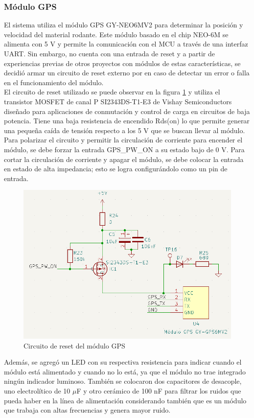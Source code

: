 \subsubsection{Módulo GPS}


El sistema utiliza el módulo GPS GY-NEO6MV2 para determinar la posición y velocidad del material rodante. Este módulo basado en el chip NEO-6M se alimenta con 5 V y permite la comunicación con el MCU a través de una interfaz UART. Sin embargo, no cuenta con una entrada de reset y a partir de experiencias previas de otros proyectos con módulos de estas características, se decidió armar un circuito de reset externo por en caso de detectar un error o falla en el funcionamiento del módulo. \\ 

El circuito de reset utilizado se puede observar en la figura \ref{fig:gps_sch} y utiliza el transistor MOSFET de canal P SI2343DS-T1-E3 de Vishay Semiconductors \cite{SI2343DS-T1-E3} diseñado para aplicaciones de conmutación y  control de carga en circuitos de baja potencia. Tiene una baja resistencia de encendido Rds(on) lo que permite generar una pequeña caída de tensión respecto a los 5 V que se buscan llevar al módulo. Para polarizar el circuito y permitir la circulación de corriente para encender el módulo, se debe forzar la entrada GPS\_PW\_ON a su estado bajo de 0 V. Para cortar la circulación de corriente y apagar el módulo, se debe colocar la entrada en estado de alta impedancia; esto se logra configurándolo como un pin de entrada.\\ 

\begin{figure}[H]
    \centering
    \includegraphics[width = 0.8 \linewidth]{img/gps_sch.png}
    \caption{Circuito de reset del módulo GPS}
    \label{fig:gps_sch}
\end{figure}    

Además, se agregó un LED con su respectiva resistencia para indicar cuando el módulo está alimentado y cuando no lo está, ya que el módulo no trae integrado ningún indicador luminoso. También se colocaron dos capacitores de desacople, uno electrolítico de 10 $\mu$F y otro cerámico de 100 nF para filtrar los ruidos que pueda haber en la línea de alimentación considerando también que es un módulo que trabaja con altas frecuencias y genera mayor ruido. 
